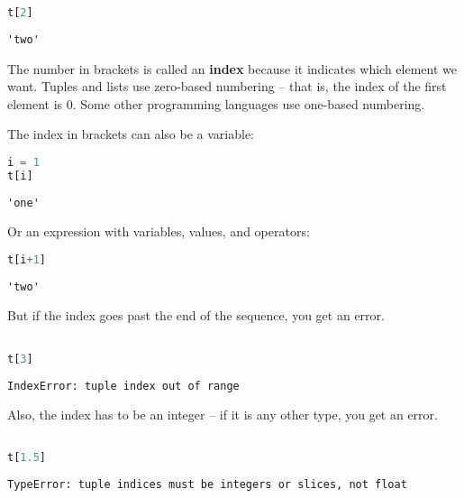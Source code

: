 \begin{lstlisting}[language=Python,style=source]
t[2]
\end{lstlisting}

\begin{lstlisting}[style=output]
'two'
\end{lstlisting}

The number in brackets is called an \textbf{index} because it indicates
which element we want. Tuples and lists use zero-based numbering -- that
is, the index of the first element is 0. Some other programming
languages use one-based numbering.

The index in brackets can also be a variable:

\begin{lstlisting}[language=Python,style=source]
i = 1
t[i]
\end{lstlisting}

\begin{lstlisting}[style=output]
'one'
\end{lstlisting}

Or an expression with variables, values, and operators:

\begin{lstlisting}[language=Python,style=source]
t[i+1]
\end{lstlisting}

\begin{lstlisting}[style=output]
'two'
\end{lstlisting}

But if the index goes past the end of the sequence, you get an error.

\begin{lstlisting}[language=Python,style=source]
%%expect IndexError

t[3]
\end{lstlisting}

\begin{lstlisting}[style=output]
IndexError: tuple index out of range
\end{lstlisting}

Also, the index has to be an integer -- if it is any other type, you get
an error.

\begin{lstlisting}[language=Python,style=source]
%%expect TypeError

t[1.5]
\end{lstlisting}

\begin{lstlisting}[style=output]
TypeError: tuple indices must be integers or slices, not float
\end{lstlisting}

